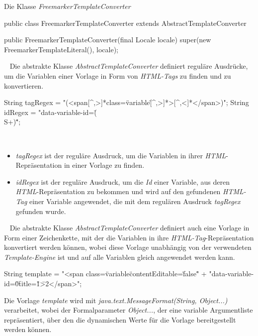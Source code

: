 \begin{program}[h]
\caption{Die Klasse \emph{FreemarkerTemplateConverter}}
\label{prog:freemarkerTemplateConverter}
\begin{JavaCode}
public class FreemarkerTemplateConverter 
                          extends AbstractTemplateConverter {

    public FreemarkerTemplateConverter(final Locale locale) {
        super(new FreemarkerTemplateLiteral(), locale);
    }
}
\end{JavaCode}
\end{program}
\ \newline
Die abstrakte Klasse \emph{AbstractTemplateConverter} definiert reguläre Ausdrücke, um die Variablen einer Vorlage in Form von \emph{HTML-Tags} zu finden und zu konvertieren.
\begin{JavaCode}[numbers=none]
String tagRegex = "(<span[^,>]*class=\"variable\"[^,>]*>[^,<]*</span>)";
String idRegex  = "data-variable-id=\"(\\S+)\"";
\end{JavaCode}
\ \begin{itemize}
	\item\emph{tagRegex} ist der reguläre Ausdruck, um die Variablen in ihrer \emph{HTML}-Repräsentation in einer Vorlage zu finden.
	\item\emph{idRegex} ist der reguläre Ausdruck, um die \emph{Id} einer Variable, aus deren \emph{HTML}-Repräsentation zu bekommen und wird auf den gefundenen \emph{HTML-Tag} einer Variable angewendet, die mit dem regulären Ausdruck \emph{tagRegex} gefunden wurde.
\end{itemize}
\ \newline
Die abstrakte Klasse \emph{AbstractTemplateConverter} definiert auch eine Vorlage in Form einer Zeichenkette, mit der die Variablen in ihre \emph{HTML-Tag}-Repräsentation konvertiert werden können, wobei diese Vorlage unabhängig von der verwendeten \emph{Template-Engine} ist und auf alle Variablen gleich angewendet werden kann.
\begin{JavaCode}
String template = "<span class=\"variable\" contentEditable=\"false\" "
                + "data-variable-id=\"{0}\" title=\"{1}\">{2}</span>";
\end{JavaCode}
Die Vorlage \emph{template} wird mit \emph{java.text.MessageFormat(String, Object...)} verarbeitet, wobei der Formalparameter \emph{Object...}, der eine variable Argumentliste repräsentiert, über den die dynamischen Werte für die Vorlage bereitgestellt werden können. 

